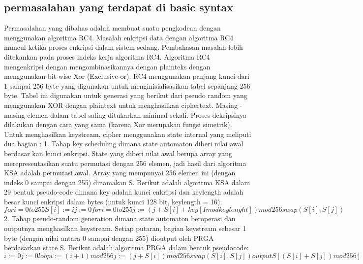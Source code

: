 \subsection {permasalahan yang terdapat di basic syntax}
Permasalahan yang dibahas adalah membuat suatu pengkodean dengan
menggunakan algoritma RC4. Masalah enkripsi data dengan algoritma RC4
muncul ketika proses enkripsi dalam sistem sedang. Pembahasan masalah lebih
ditekankan pada proses indeks kerja algoritma RC4.
Algoritma RC4 mengenkripsi dengan mengombinasikannya dengan
plainteks dengan menggunakan bit-wise Xor (Exclusive-or). RC4 menggunakan
panjang kunci dari 1 sampai 256 byte yang digunakan untuk menginisialisasikan
tabel sepanjang 256 byte. Tabel ini digunakan untuk generasi yang berikut dari
pseudo random yang menggunakan XOR dengan plaintext untuk menghasilkan
ciphertext. Masing - masing elemen dalam tabel saling ditukarkan minimal sekali.
Proses dekripsinya dilakukan dengan cara yang sama (karena Xor merupakan
fungsi simetrik). Untuk menghasilkan keystream, cipher menggunakan state
internal yang meliputi dua bagian :
1. Tahap key scheduling dimana state automaton diberi nilai awal berdasar kan
kunci enkripsi.
State yang diberi nilai awal berupa array yang merepresentasikan suatu
permutasi dengan 256 elemen, jadi hasil dari algoritma KSA adalah
permutasi awal. Array yang mempunyai 256 elemen ini (dengan indeks 0
sampai dengan 255) dinamakan S. Berikut adalah algoritma KSA dalam 
29
bentuk pseudo-code dimana key adalah kunci enkripsi dan keylength adalah besar kunci enkripsi dalam bytes (untuk kunci 128 bit, keylength = 16).
\begin {equation}
for i = 0 to 255
S [i] := i
j := 0
for i = 0 to 255
j := (j + S[i] + key [I mod keylenght] ) mod 256
swap (S[i], S[j])
\end {equation}
2. Tahap pseudo-random generation dimana state automaton beroperasi dan
outputnya menghasilkan keystream. Setiap putaran, bagian keystream sebesar
1 byte (dengan nilai antara 0 sampai dengan 255) dioutput oleh PRGA
berdasarkan state S. Berikut adalah algoritma PRGA dalam bentuk pseudocode:
\begin {equation}
i := 0
j := 0
loop
i := ( i + 1 ) mod 256
j := ( j + S[i] ) mod 256
swap ( S[i], S[j] )
output S[ (S[i] + S[j]) mod 256]
\end {equation}
